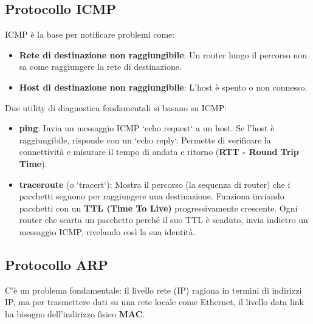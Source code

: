 \subsection{Protocollo ICMP}
ICMP è la base per notificare problemi come:
\begin{itemize}
    \item \textbf{Rete di destinazione non raggiungibile}: Un router lungo il percorso non sa come raggiungere la rete di destinazione.
    \item \textbf{Host di destinazione non raggiungibile}: L'host è spento o non connesso.
\end{itemize}
Due utility di diagnostica fondamentali si basano su ICMP:
\begin{itemize}
    \item \textbf{ping}: Invia un messaggio ICMP `echo request` a un host. Se l'host è raggiungibile, risponde con un `echo reply`. Permette di verificare la connettività e misurare il tempo di andata e ritorno (\textbf{RTT - Round Trip Time}).
    \item \textbf{traceroute} (o `tracert`): Mostra il percorso (la sequenza di router) che i pacchetti seguono per raggiungere una destinazione. Funziona inviando pacchetti con un \textbf{TTL (Time To Live)} progressivamente crescente. Ogni router che scarta un pacchetto perché il suo TTL è scaduto, invia indietro un messaggio ICMP, rivelando così la sua identità.
\end{itemize}

\subsection{Protocollo ARP}
C'è un problema fondamentale: il livello rete (IP) ragiona in termini di indirizzi IP, ma per trasmettere dati su una rete locale come Ethernet, il livello data link ha bisogno dell'indirizzo fisico \textbf{MAC}.

